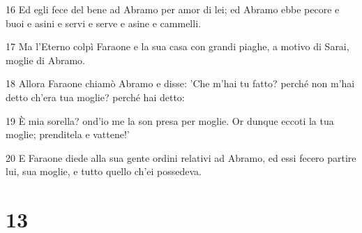 \par 16 Ed egli fece del bene ad Abramo per amor di lei; ed Abramo ebbe pecore e buoi e asini e servi e serve e asine e cammelli.
\par 17 Ma l'Eterno colpì Faraone e la sua casa con grandi piaghe, a motivo di Sarai, moglie di Abramo.
\par 18 Allora Faraone chiamò Abramo e disse: 'Che m'hai tu fatto? perché non m'hai detto ch'era tua moglie? perché hai detto:
\par 19 È mia sorella? ond'io me la son presa per moglie. Or dunque eccoti la tua moglie; prenditela e vattene!'
\par 20 E Faraone diede alla sua gente ordini relativi ad Abramo, ed essi fecero partire lui, sua moglie, e tutto quello ch'ei possedeva.

\chapter{13}


